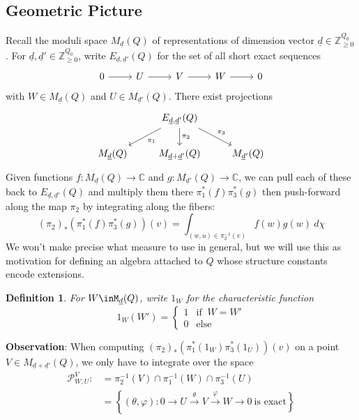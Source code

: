 \documentclass{book}
\newtheorem{definition}[theorem]{Definition}
\begin{document}
    	\subsection{Geometric Picture}
        	Recall the moduli space $M_{\underline{d}}(Q)$ of representations of dimension vector $\underline{d}\in \mathbb{Z}_{\geq 0}^{Q_0}$. For $\underline{d},\underline{d}'\in \mathbb{Z}_{\geq 0}^{Q_0}$, write $E_{\underline{d},\underline{d}'}(Q)$ for the set of all short exact sequences
            		\[ \begin{tikzcd}
				0 \arrow{r} & U \arrow{r} &V \arrow{r} &W \arrow{r} &0
			\end{tikzcd}\]
		with $W\in M_{\underline{d}}(Q)$ and $U\in M_{\underline{d}'}(Q)$. There exist projections
			\[ \begin{tikzcd} &\arrow{dl}{\pi_1} E_{\underline{d},\underline{d}'}(Q)\arrow{d}{\pi_2}\arrow{dr}{\pi_3}& \\
		    		M_{\underline{d}}(Q) & M_{\underline{d}+\underline{d}'}(Q) & M_{\underline{d}'}(Q)
			\end{tikzcd}\]
        	Given functions $f:M_{\underline{d}}(Q)\to \mathbb{C}$ and $g:M_{\underline{d}'}(Q)\to \mathbb{C}$, we can pull each of these back to $E_{\underline{d},\underline{d}'}(Q)$ and multiply them there $\pi_1^*(f)\pi_3^*(g)$ then push-forward along the map $\pi_2$ by integrating along the fibers:
        	\[(\pi_2)_*\left(\pi_1^*(f)\pi_3^*(g)\right)(v)=\int_{(w,u)\in \pi_2^{-1}(v)}f(w)g(w) \ d\chi\]
        	We won't make precise what measure to use in general, but we will use this as motivation for defining an algebra attached to $Q$ whose structure constants encode extensions.
    
    \begin{definition}
        For $W\inM_{\underline{d}}(Q)$, write $1_W$ for the characteristic function
        \[1_W(W') = \begin{cases} 
        1 & \text{if } \  W=W' \\
        0 & \text{else}
        \end{cases}\]
    \end{definition}
    
    \textbf{Observation}: When computing $(\pi_2)_*(\pi_1^*(1_W)\pi_3^*(1_U))(v)$ on a point $V\in M_{\underline{d}+\underline{d}'}(Q)$, we only have to integrate over the space 
    \begin{align*}
        \mathcal{P}_{W,U}^V :&= \pi_2^{-1}(V)\cap\pi_1^{-1}(W)\cap \pi_3^{-1}(U)\\
        &= \left\{ (\theta,\varphi): 
        0\to U\xrightarrow{\theta} V\xrightarrow{\varphi} W\to 0
        \ \text{is exact}\right\}
    \end{align*}
    
\end{document}

